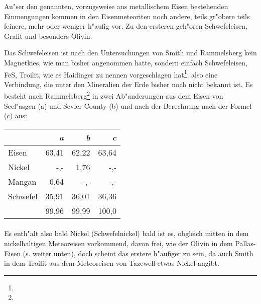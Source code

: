 \documentclass[a4paper, 11pt, oneside]{article}
\begin{document}
Au"ser den genannten, vorzugsweise aus metallischem Eisen bestehenden Einmengungen kommen in den Eisenmeteoriten noch andere, teils gr"obere teils feinere, mehr oder weniger h"aufig vor. Zu den ersteren geh"oren Schwefeleisen, Grafit und besonders Olivin.

Das Schwefeleisen ist nach den Untersuchungen von Smith und Rammelsberg kein Magnetkies, wie man bisher angenommen hatte, sondern einfach Schwefeleisen, FeS, Troilit, wie es Haidinger zu nennen vorgeschlagen hat\footnote{}; also eine Verbindung, die unter den Mineralien der Erde bisher noch nicht bekannt ist. Es besteht nach Rammelsberg\footnote{} in zwei Ab"anderungen aus dem Eisen von Seel"asgen (a) und Sevier County (b) und nach der Berechnung nach der Formel (c) aus:
\begin{center}
\begin{tabular}{ |l|r|r|r| }
    \hline
     & \emph{a} & \emph{b} & \emph{c}\\
    \hline\hline
    Eisen & 63,41 & 62,22 & 63,64\\\hline
    Nickel & -,- & 1,76 & -,-\\\hline
    Mangan & 0,64 & -,- & -,-\\\hline
    Schwefel & 35,91 & 36,01 & 36,36\\\hline
     & 99,96 & 99,99 & 100,0\\
    \hline
\end{tabular}
\end{center}
\paragraph{}
Es enth"alt also bald Nickel (Schwefelnickel) bald ist es, obgleich mitten in dem nickelhaltigen Meteoreisen vorkommend, davon frei, wie der Olivin in dem Pallas-Eisen (s. weiter unten), doch scheint das erstere h"aufiger zu sein, da auch Smith in dem Troilit aus dem Meteoreisen von Tazewell etwas Nickel angibt. 
\end{document}
